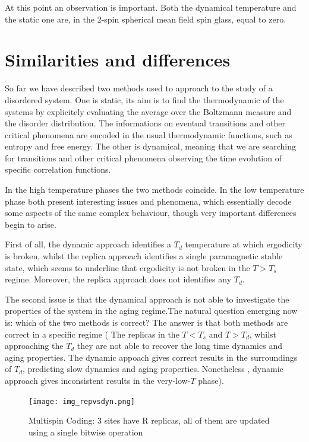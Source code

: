 \documentclass{article}
\begin{document}
At this point an observation is important. Both the dynamical temperature and the static one are,
 in the 2-spin spherical mean field spin glass, equal to zero.


\section{Similarities and differences}

So far we have described two methods used to approach to the study of a
disordered system. One is static, its aim is to find the thermodynamic of the
systems by explicitely evaluating the average over the Boltzmann measure and
the disorder distribution. The informations on eventual transitions and other
critical phenomena are encoded in the usual thermodynamic functions, such as
entropy and free energy. The other is dynamical, meaning that we are searching
for transitions and other critical phenomena observing the time evolution of
specific correlation functions.

In the high temperature phases the two methods coincide. 
In the low temperature phase both present
interesting issues and phenomena, which essentially decode some aspects of the same complex behaviour, 
though very important differences begin to arise.

First of all, the dynamic approach identifies a $T_d$ temperature at which ergodicity is broken, whilst the replica approach identifies a single paramagnetic stable state, which seems to underline that ergodicity is not broken in the $T>T_s$ regime. Moreover, the replica approach does not identifies any $T_d$.

The second issue is that the dynamical approach is not able to investigate the properties of the system in the aging regime.The natural question emerging now is: which of the two methods is correct? The answer is that both methods are correct in a specific regime ( The replicas in the $T<T_s$ and $T>T_d$, whilst approaching the $T_d$ they are not able to recover the long time dynamics and aging properties. The dynamic appoach gives correct results in the surroundings of $T_d$, predicting slow dynamics and aging properties. Nonetheless , dynamic approach gives inconsistent results in the very-low-$T$ phase).


\begin{figure}[h]
		\texttt{[image: img\_repvsdyn.png]}
	\label{fig:img_multispin}
	\caption{Multispin Coding: 3 sites have R replicas, all of them are updated using a single bitwise operation}

\end{figure}
\end{document}
